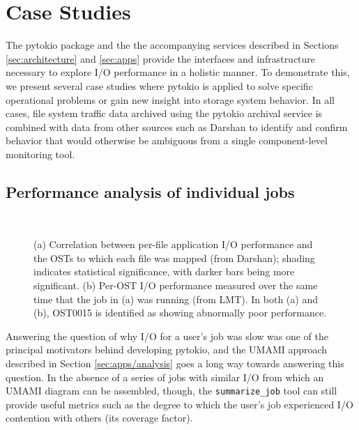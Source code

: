 \section{Case Studies}
\label{sec:results}

The pytokio package and the the accompanying services described in Sections \ref{sec:architecture} and \ref{sec:apps} provide the interfaces and infrastructure necessary to explore I/O performance in a holistic manner.
To demonstrate this, we present several case studies where pytokio is applied to solve specific operational problems or gain new insight into storage system behavior.
In all cases, file system traffic data archived using the pytokio archival service is combined with data from other sources such as Darshan to identify and confirm behavior that would otherwise be ambiguous from a single component-level monitoring tool.

\subsection{Performance analysis of individual jobs} \label{sec:results/users}

\begin{figure}
    \centering
    \\

    \caption{%
    (a) Correlation between per-file application I/O performance and the OSTs to which each file was mapped (from Darshan); shading indicates statistical significance, with darker bars being more significant.
    (b) Per-OST I/O performance measured over the same time that the job in (a) was running (from LMT).
    In both (a) and (b), OST0015 is identified as showing abnormally poor performance.
    }
    \label{fig:straggling-ost}
    \vspace{-.2in}
\end{figure}

Answering the question of why I/O for a user's job was slow was one of the principal motivators behind developing pytokio, and the UMAMI approach described in Section \ref{sec:apps/analysis} goes a long way towards answering this question.
In the absence of a series of jobs with similar I/O from which an UMAMI diagram can be assembled, though, the \texttt{summarize\_job} tool can still provide useful metrics such as the degree to which the user's job experienced I/O contention with others (its coverage factor).

